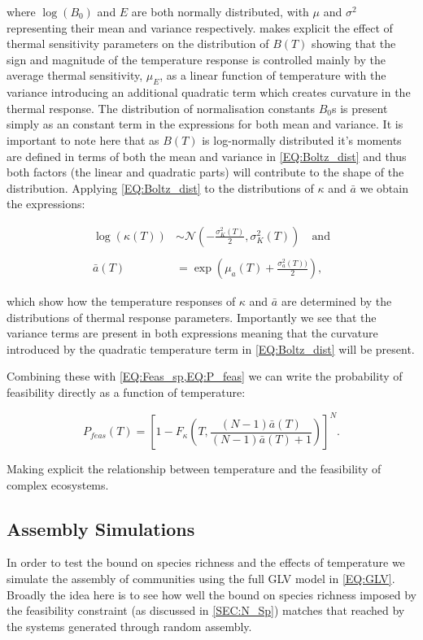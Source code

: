 \documentclass{article}
\begin{document}
where $\log(B_0)$ and $E$ are both normally distributed, with $\mu$ and $\sigma^2$ representing their mean and variance respectively.  makes explicit the effect of thermal sensitivity parameters on the distribution of $B(T)$ showing that the sign and magnitude of the temperature response is controlled mainly by the average thermal sensitivity, $\mu_E$, as a linear function of temperature with the variance introducing an additional quadratic term which creates curvature in the thermal response. The distribution of normalisation constants $B_0$s is present simply as an constant term in the expressions for both mean and variance. It is important to note here that as $B(T)$ is log-normally distributed it's moments are defined in terms of both the mean and variance in \cref{EQ:Boltz_dist} and thus both factors (the linear and quadratic parts) will contribute to the shape of the distribution. Applying \cref{EQ:Boltz_dist} to the distributions of $\kappa$ and $\bar{a}$ we obtain the expressions:

\begin{align} \label{EQ:Trait_distributions}
        \log(\kappa(T)) &\sim \mathcal{N}\left( -\frac{\sigma_{K}^2(T)}{2} , \sigma_{K}^2(T) \right) \quad \text{and} \\ \nonumber \\
        \bar{a}(T) &= \exp \left(\mu_a(T) + \frac{\sigma_a^2(T))}{2} \right),
\end{align}

which show how the temperature responses of $\kappa$ and $\bar{a}$ are determined by the distributions of thermal response parameters. Importantly we see that the variance terms are present in both expressions meaning that the curvature introduced by the quadratic temperature term in \cref{EQ:Boltz_dist} will be present. 

Combining these with \cref{EQ:Feas_sp,EQ:P_feas} we can write the probability of feasibility directly as a function of temperature:

\begin{equation} \label{EQ:P_feas_Temp}
    P_{feas}(T) = \left[1 - F_{\kappa}\left(T , \frac{(N-1)\bar{a}(T)}{(N-1)\bar{a}(T) + 1} \right) \right]^N.
\end{equation}

Making explicit the relationship between temperature and the feasibility of complex ecosystems. 

\subsection{Assembly Simulations}
In order to test the bound on species richness and the effects of temperature we simulate the assembly of communities using the full GLV model in \cref{EQ:GLV}. Broadly the idea here is to see how well the bound on species richness imposed by the feasibility constraint (as discussed in \cref{SEC:N_Sp}) matches that reached by the systems generated through random assembly.  
\end{document}
